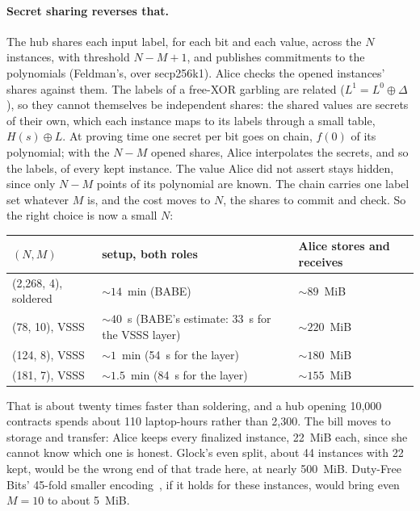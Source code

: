 \documentclass[11pt]{article}
\begin{document}
\paragraph{Secret sharing reverses that.} The hub shares each input
label, for each bit and each value, across the $N$ instances, with
threshold $N - M + 1$, and publishes commitments to the polynomials
(Feldman's, over secp256k1). Alice checks the opened instances' shares
against them. The labels of a free-XOR garbling are related
($L^1 = L^0 \oplus \Delta$), so they cannot themselves be independent
shares: the shared values are secrets of their own, which each instance
maps to its labels through a small table, $H(s) \oplus L$. At proving
time one secret per bit goes on chain, $f(0)$ of its polynomial; with
the $N - M$ opened shares, Alice interpolates the secrets, and so the
labels, of every kept instance. The value Alice did not
assert stays hidden, since only $N - M$ points of its polynomial are
known. The chain carries one label set whatever $M$ is, and the cost
moves to $N$, the shares to commit and check. So the right choice is
now a small $N$:
\begin{center}
\small
\begin{tabularx}{\linewidth}{>{\raggedright\arraybackslash}p{30mm}LL}
\toprule
$(N, M)$ & setup, both roles & Alice stores and receives \\
\midrule
(2,268, 4), soldered & ${\sim}14$~min (BABE) & ${\sim}89$~MiB \\
(78, 10), VSSS & ${\sim}40$~s (BABE's estimate: 33~s for the VSSS layer) & ${\sim}220$~MiB \\
(124, 8), VSSS & ${\sim}1$~min (54~s for the layer) & ${\sim}180$~MiB \\
(181, 7), VSSS & ${\sim}1.5$~min (84~s for the layer) & ${\sim}155$~MiB \\
\bottomrule
\end{tabularx}
\end{center}
That is about twenty times faster than soldering, and a hub opening
10,000 contracts spends about 110 laptop-hours rather than 2,300. The
bill moves to storage and transfer: Alice keeps every finalized instance,
22~MiB each, since she cannot know which one is honest. Glock's even
split, about 44 instances with 22 kept, would be the wrong end of that
trade here, at nearly 500~MiB. Duty-Free Bits' 45-fold smaller
encoding~\cite{dutyfree}, if it holds for these instances, would bring
even $M = 10$ to about 5~MiB.
\end{document}
